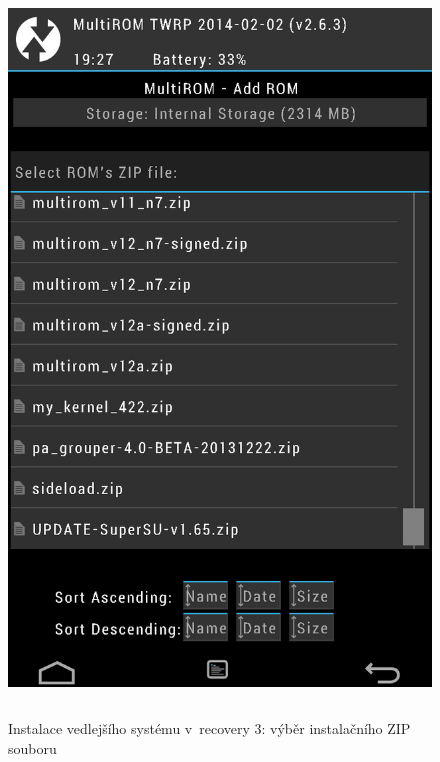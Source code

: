 \documentclass[12pt, a4paper, oneside]{article}
\begin{document}
\begin{figure}[H]
\begin{center}
 \includegraphics[height=550pt]{img/recovery_install3.png}
\caption{Instalace vedlejšího systému v~recovery 3: výběr instalačního ZIP souboru}
\end{center}
\end{figure}
\end{document}
